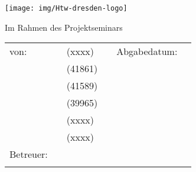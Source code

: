 \begin{titlepage}
    \thispagestyle{empty}
    \enlargethispage{35mm}
    \setlength{\headheight}{0mm}

    \sffamily



    \iftitlelogo{}
        \hspace{-1cm}\texttt{[image: img/Htw-dresden-logo]}
    \else
        {%
            \mdseries
            \Huge \MakeUppercase{\myDefUniversity}\\\vspace{0.5em}
        }
    \fi

    \vfill
    \vspace{10mm}
    \begin{center}
        \begin{huge}
            \myDefTitle{}
            \vfill
        \end{huge}
        \begin{Large}
            Im Rahmen des Projektseminars \\ 
            \myDefSeminar{}
            \vfill
        \end{Large}

    \end{center}

    \vfill
    \iftitlefinal{}
        \begin{small}
            \begin{tabularx}{\textwidth}{lllXll}
            	von: & \myDefAuthorA{} & (xxxx) & & Abgabedatum:  & \myDefDateHandIn{}\\
            	& \myDefAuthorB{} & (41861) \\
            	& \myDefAuthorC{} & (41589) \\
            	& \myDefAuthorD{} & (39965) \\
            	& \myDefAuthorE{} & (xxxx) \\
            	& \myDefAuthorF{} & (xxxx) \\
                Betreuer:    & \multicolumn{2}{l}{\myDefSupervisor{}} \\
                &  \multicolumn{2}{l}{\myDefChair{}} \\
            \end{tabularx}
        \end{small}
        \vspace{2em}
    \fi
    \vspace{3em}

    \normalsize

\end{titlepage}

